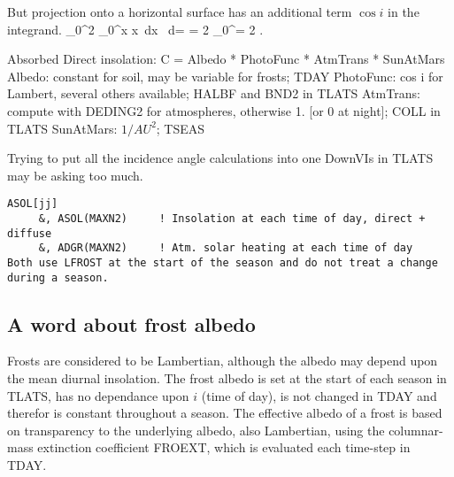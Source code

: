 But projection onto a horizontal surface has an additional term $\cos i $ in the integrand.  
\qb \int_0^{2\pi} \int_0^\theta \sin x \cos x\  dx \ d\phi =  = 2 \pi {}_0^\theta = 2 \pi {} \qe
.  

Absorbed Direct insolation: C = Albedo * PhotoFunc * AtmTrans * SunAtMars 
\qi Albedo: constant for soil, may be variable for frosts;   TDAY
\qi PhotoFunc: cos i for Lambert, several others available;  HALBF and BND2 in TLATS
\qi AtmTrans: compute with DEDING2 for atmospheres, otherwise 1. [or 0 at night]; COLL in TLATS
\qi SunAtMars: $1/AU^2$; TSEAS 


Trying to put all the incidence angle calculations into one DownVIs in TLATS may be asking too much.
\vspace{-3.mm} 
\begin{verbatim} 
ASOL[jj]                    
     &, ASOL(MAXN2)     ! Insolation at each time of day, direct + diffuse
     &, ADGR(MAXN2)     ! Atm. solar heating at each time of day 
Both use LFROST at the start of the season and do not treat a change during a season.
\end{verbatim} 



\subsection{A word about frost albedo}
 Frosts are considered to be Lambertian, although the albedo may depend upon the
 mean diurnal insolation. The frost albedo is set at the start of each season in
 TLATS, has no dependance upon $i$ (time of day), is not changed in TDAY and
 therefor is constant throughout a season. The effective albedo of a frost is
 based on transparency to the underlying albedo, also Lambertian, using the
 columnar-mass extinction coefficient FROEXT, which is evaluated each time-step
 in TDAY.


